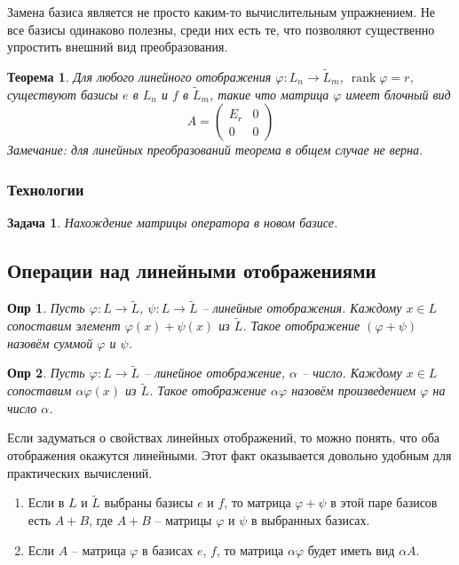 \documentclass[a4paper,12pt]{article}
\DeclareMathOperator{\rank}{\mathop{rank}}
\newtheorem*{definition}{Опр}
\newtheorem{theorem}{Теорема}[section]
\newtheorem*{prob}{Задача}
\begin{document}
Замена базиса является не просто каким-то вычислительным упражнением. Не все базисы одинаково полезны, среди них есть те, что позволяют существенно упростить внешний вид преобразования.

\begin{theorem}
	Для любого линейного отображения $\varphi: L_n \to \tilde{L}_m$, $\rank \varphi = r$, существуют базисы $e$ в $L_n$ и $f$ в $\tilde{L}_m$, такие что матрица $\varphi$ имеет блочный вид
	\[
		A = \begin{pmatrix}
			E_r & 0 \\
			0 & 0 
		\end{pmatrix}
	\]	
	Замечание: для линейных преобразований теорема в общем случае не верна.
\end{theorem}

\subsubsection{Технологии}
\begin{prob}
	Нахождение матрицы оператора в новом базисе.
\end{prob}

\subsection{Операции над линейными отображениями}
\begin{definition}
	Пусть $\varphi: L \to \tilde{L}$, $\psi: L \to \tilde{L}$ -- линейные отображения. Каждому $x \in L$ сопоставим элемент $\varphi(x) + \psi(x)$ из $\tilde{L}$. Такое отображение $(\varphi + \psi)$ назовём суммой $\varphi$ и $\psi$.
\end{definition}

\begin{definition}
	Пусть $\varphi: L \to \tilde{L}$ -- линейное отображение, $\alpha$ -- число. Каждому $x \in L$ сопоставим $\alpha \varphi(x)$ из $\tilde{L}$. Такое отображение $\alpha \varphi$ назовём произведением $\varphi$ на число $\alpha$.
\end{definition}

Если задуматься о свойствах линейных отображений, то можно понять, что оба отображения окажутся линейными. Этот факт оказывается довольно удобным для практических вычислений. 

\begin{enumerate}
	\item Если в $L$ и $\tilde{L}$ выбраны базисы $e$ и $f$, то матрица $\varphi + \psi$ в этой паре базисов есть $A + B$, где $A + B$ -- матрицы $\varphi$ и $\psi$ в выбранных базисах.
	\item Если $A$ -- матрица $\varphi$ в базисах $e$, $f$, то матрица $\alpha \varphi$ будет иметь вид $\alpha A$.
\end{enumerate}
\end{document}
